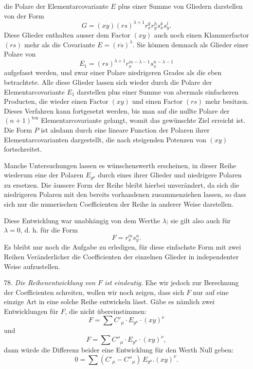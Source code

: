 \documentclass[11pt]{article}
\begin{document}
die Polare der Elementarcovariante $E$ plus einer Summe von Gliedern darstellen von der Form
\[ G = (xy)(rs)^{\lambda+1} r_x^g r_y^h s_x^k s_y^l. \]
Diese Glieder enthalten ausser dem Factor $(xy)$ auch noch einen Klammerfactor $(rs)$ mehr als die Covariante $E = (\overline{rs})^\lambda$. Sie können demnach als Glieder einer Polare von
\[ E_1 = (rs)^{\lambda+1} r_x^{m-\lambda-1} s_x^{n-\lambda-1} \]
aufgefasst werden, und zwar einer Polare niedrigeren Grades als die eben betrachtete. Alle diese Glieder lassen sich wieder durch die Polare der Elementarcovariante $E_1$ darstellen plus einer Summe von abermals einfacheren Producten, die wieder einen Factor $(xy)$ und einen Factor $(rs)$ mehr besitzen. Dieses Verfahren kann fortgesetzt werden, bis man auf die nullte Polare der $(n+1)^{\text{ten}}$ Elementarcovariante gelangt, womit das gewünschte Ziel erreicht ist. Die Form $P$ ist alsdann durch eine lineare Function der Polaren ihrer Elementarcovarianten dargestellt, die nach steigenden Potenzen von $(xy)$ fortschreitet.

Manche Untersuchungen lassen es wünschenswerth erscheinen, in dieser Reihe wiederum eine der Polaren $E_{y^\mu}$ durch eines ihrer Glieder und niedrigere Polaren zu ersetzen. Die äussere Form der Reihe bleibt hierbei unverändert, da sich die niedrigeren Polaren mit den bereits vorhandenen zusammenziehen lassen, so dass sich nur die numerischen Coefficienten der Reihe in anderer Weise darstellen.

Diese Entwicklung war unabhängig von dem Werthe $\lambda$; sie gilt also auch für $\lambda = 0$, d. h. für die Form
\[ F = r_x^m s_y^n. \]
Es bleibt nur noch die Aufgabe zu erledigen, für diese einfachste Form mit zwei Reihen Veränderlicher die Coefficienten der einzelnen Glieder in independenter Weise aufzustellen.

78. \textit{Die Reihenentwicklung von $F$ ist eindeutig.} Ehe wir jedoch zur Berechnung der Coefficienten schreiten, wollen wir noch zeigen, dass sich $F$ nur auf eine einzige Art in eine solche Reihe entwickeln lässt. Gäbe es nämlich zwei Entwicklungen für $F$, die nicht übereinstimmen:
\[ F = \sum C'_\mu \cdot E_{y^\mu} \cdot (xy)^\nu \]
und
\[ F = \sum C''_\mu \cdot E_{y^\mu} \cdot (xy)^\nu, \]
dann würde die Differenz beider eine Entwicklung für den Werth Null geben:
\[ 0 = \sum (C'_\mu - C''_\mu)\, E_{y^\mu} . (xy)^\nu . \]
\end{document}
